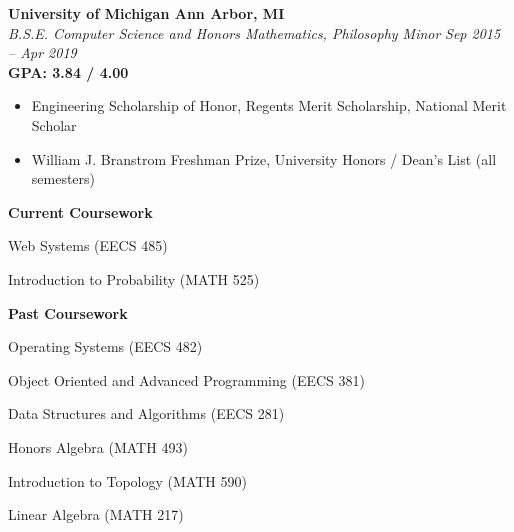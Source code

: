 \documentclass[margin,line]{resume}
\begin{document}
\begin{resume}
	\textbf{University of Michigan \hfill Ann Arbor, MI} \\\vspace{1mm}%
	\textsl{B.S.E. Computer Science and Honors Mathematics, Philosophy Minor} \hfill \textsl{Sep 2015 -- Apr 2019}\vspace{-1mm}\\
	\textbf{GPA: 3.84 / 4.00} \\\vspace{-2.5mm}%
	\begin{itemize}[leftmargin=4mm]
		\item Engineering Scholarship of Honor, Regents Merit Scholarship, National Merit Scholar
		\item William J. Branstrom Freshman Prize, University Honors / Dean's List (all semesters)
	\end{itemize}
	\vspace{-5mm}
	\begin{center} \textbf{Current Coursework} \end{center}
	\vspace{-3mm}
	\small
	\begin{itemize}[leftmargin=4mm]
		\begin{minipage}[t]{.6\linewidth}
			\item Web Systems (EECS 485)
		\end{minipage}%
		\begin{minipage}[t]{.5\linewidth}
			\item Introduction to Probability (MATH 525)
		\end{minipage}%
	\end{itemize}
	\normalsize
	\vspace{-8mm}
	\begin{center} \textbf{Past Coursework} \end{center}
	\vspace{-3mm}
	\small
	\begin{itemize}[leftmargin=4mm]
		\begin{minipage}[t]{.6\linewidth}
			\item Operating Systems (EECS 482)
			\item Object Oriented and Advanced Programming (EECS 381)
			\item Data Structures and Algorithms (EECS 281)
		\end{minipage}%
		\begin{minipage}[t]{.5\linewidth}
			\item Honors Algebra (MATH 493)
			\item Introduction to Topology (MATH 590)
			\item Linear Algebra (MATH 217)
		\end{minipage}%
	\end{itemize}
	\normalsize
	\sectionbreak
	\vspace{-2.5mm}

\end{resume}
\end{document}
